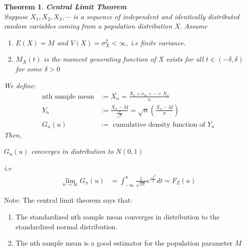 \documentclass[11pt,oneside]{book}
\theoremstyle{break}
\theoremstyle{break}
\newtheorem{thm}{Theorem}[section]
\newcommand{\note}{\color{Purple}Note: \color{black}}
\begin{document}
\begin{thm}
\textbf{Central Limit Theorem}\\
Suppose $X_1,X_2,X_3,\cdots$ is a sequence of independent and identically distributed random variables coming from a population distribution X. Assume \begin{enumerate}
\item $E(X)=M$ and $V(X)=\sigma_X^2<\infty$, i.e finite variance.
\item $M_X(t)$ is the moment generating function of X exists for all $t\in (-\delta, \delta)$ for some $\delta >0$
\end{enumerate}
We define: \begin{align*}
\text{nth sample mean}&:=\bar{X_n}=\frac{X_1+x_@+\cdots+X_n}{n}\\
Y_n&:=\frac{\bar{X_n}-M}{\frac{\sigma}{\sqrt{n}}}=\sqrt{n}\left(\frac{\bar{X_n}-M}{\sigma}\right)\\
G_n(u)&:=\text{ cumulative density function of }Y_n
\end{align*}
Then,\begin{center}
$G_n(u)$ converges in distribution to $N(0,1)$
\end{center}
i.e \begin{align*}
\lim_{n\to \infty}G_n(u)&=\int_{-\infty}^{u}\frac{1}{\sqrt{2\pi}}e^{\frac{-t^2}{2}}dt=F_Z(u)
\end{align*}
\end{thm}
\note The central limit theorem says that: \begin{enumerate}
\item The standardized nth sample mean converges in distribution to the standardized normal distribution. 
\item The nth sample mean is a good estimator for the population parameter $M$
\end{enumerate}
\end{document}
